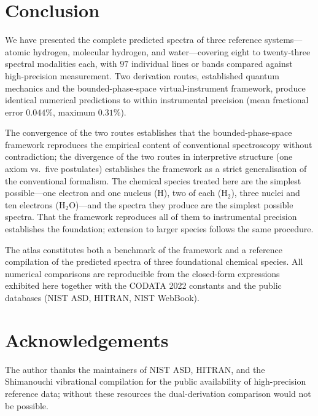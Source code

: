 \documentclass[twocolumn,11pt,a4paper]{article}
\theoremstyle{stmtstyle}
\theoremstyle{definition}
\theoremstyle{remark}
\begin{document}
\clearpage

\section*{Conclusion}

We have presented the complete predicted spectra of three reference systems---atomic hydrogen, molecular hydrogen, and water---covering eight to twenty-three spectral modalities each, with $97$ individual lines or bands compared against high-precision measurement. Two derivation routes, established quantum mechanics and the bounded-phase-space virtual-instrument framework, produce identical numerical predictions to within instrumental precision (mean fractional error $0.044\%$, maximum $0.31\%$).

The convergence of the two routes establishes that the bounded-phase-space framework reproduces the empirical content of conventional spectroscopy without contradiction; the divergence of the two routes in interpretive structure (one axiom vs.\ five postulates) establishes the framework as a strict generalisation of the conventional formalism. The chemical species treated here are the simplest possible---one electron and one nucleus (H), two of each (H$_{2}$), three nuclei and ten electrons (H$_{2}$O)---and the spectra they produce are the simplest possible spectra. That the framework reproduces all of them to instrumental precision establishes the foundation; extension to larger species follows the same procedure.

The atlas constitutes both a benchmark of the framework and a reference compilation of the predicted spectra of three foundational chemical species. All numerical comparisons are reproducible from the closed-form expressions exhibited here together with the CODATA 2022 constants and the public databases (NIST ASD, HITRAN, NIST WebBook).

\section*{Acknowledgements}

The author thanks the maintainers of NIST ASD, HITRAN, and the Shimanouchi vibrational compilation for the public availability of high-precision reference data; without these resources the dual-derivation comparison would not be possible.



\end{document}
